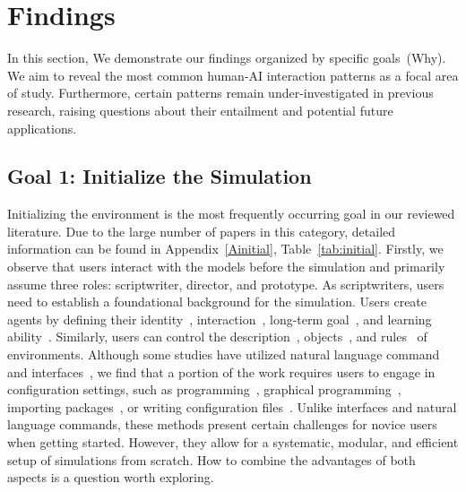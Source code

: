 \section{Findings}\label{finding}
In this section, We demonstrate our findings organized by specific goals~(Why). 
We aim to reveal the most common human-AI interaction patterns as a focal area of study. 
Furthermore, certain patterns remain under-investigated in previous research, raising questions about their entailment and potential future applications.

\subsection{Goal 1: Initialize the Simulation}

Initializing the environment is the most frequently occurring goal in our reviewed literature.
Due to the large number of papers in this category, detailed information can be found in Appendix~\ref{Ainitial}, Table~\ref{tab:initial}.
Firstly, we observe that users interact with the models before the simulation and primarily assume three roles: scriptwriter, director, and prototype.
As scriptwriters, users need to establish a foundational background for the simulation.
Users create agents by defining their identity~\cite{hua2024warpeacewaragentlarge,lin2023agentsimsopensourcesandboxlarge}, interaction~\cite{berryman2008review}, long-term goal~\cite{hong2024metagptmetaprogrammingmultiagent}, and learning ability~\cite{li2023modelscopeagentbuildingcustomizableagent}.
Similarly, users can control the description~\cite{jinxin2023cgmiconfigurablegeneralmultiagent}, objects~\cite{basavatia2023complexworld}, and rules~\cite{10.1145/3526113.3545616} of environments.
Although some studies have utilized natural language command~\cite{hong2024metagptmetaprogrammingmultiagent} and interfaces~\cite{lin2023agentsimsopensourcesandboxlarge}, we find that a portion of the work requires users to engage in configuration settings, such as programming~\cite{netlogo}, graphical programming~\cite{Ped,doi:https://doi.org/10.1002/9781118762745.ch12}, importing packages~\cite{Significant_Gravitas_AutoGPT}, or writing configuration files~\cite{lin2023agentsimsopensourcesandboxlarge}.
Unlike interfaces and natural language commands, these methods present certain challenges for novice users when getting started.
However, they allow for a systematic, modular, and efficient setup of simulations from scratch.
How to combine the advantages of both aspects is a question worth exploring.

